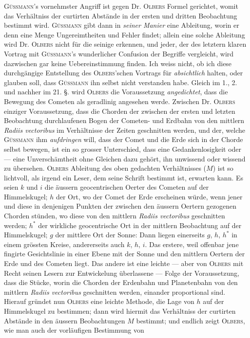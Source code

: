 \textsc{Güssmann}'s vornehmster Angriff ist gegen Dr. \textsc{Olbers} Formel gerichtet, womit das Verhältniss der curtirten Abstände in der ersten und dritten Beobachtung bestimmt wird. \textsc{Güssmann} gibt dann in \emph{seiner Manier} eine Ableitung, worin er denn eine Menge Ungereimtheiten und Fehler findet; allein eine solche Ableitung wird Dr. \textsc{Olbers} nicht für die seinige erkennen, und jeder, der des letztern klaren Vortrag mit \textsc{Güssmann}'s wunderlicher Confusion der Begriffe vergleicht, wird dazwischen gar keine Uebereinstimmung finden. Ich weiss nicht, ob ich diese durchgängige Entstellung des \textsc{Olbers}'schen Vortrags für \emph{absichtlich} halten, oder glauben soll, dass \textsc{Güssmann} ihn selbst nicht verstanden habe. Gleich im 1., 2. und nachher im 21. §. wird \textsc{Olbers} die Voraussetzung \emph{angedichtet}, dass die Bewegung des Cometen als geradlinig angesehen werde. Zwischen Dr. \textsc{Olbers} einziger Voraussetzung, dass die Chorden der zwischen der ersten und letzten Beobachtung durchlaufenen Bogen der Cometen- und Erdbahn von den mittlern \emph{Radiis vectoribus} im Verhältnisse der Zeiten geschnitten werden, und der, welche \textsc{Güssmann} ihm \emph{aufdringen} will, dass der Comet und die Erde sich in der Chorde selbst bewegen, ist ein so grosser Unterschied, dass eine Gedankenlosigkeit oder — eine Unverschämtheit ohne Gleichen dazu gehört, ihn unwissend oder wissend zu übersehen. \textsc{Olbers} Ableitung des oben gedachten Verhältnisses ($M$) ist so lichtvoll, als irgend ein Leser, dem seine Schrift bestimmt ist, erwarten kann. Es seien $k$ und $i$ die äussern geocentrischen Oerter des Cometen auf der Himmelskugel; $h$ der Ort, wo der Comet der Erde erscheinen würde, wenn jener und diese in denjenigen Punkten der zwischen den äussern Oertern gezogenen Chorden stünden, wo diese von den mittlern \emph{Radiis vectoribus} geschnitten werden; $h^*$ der wirkliche geocentrische Ort in der mittlern Beobachtung auf der Himmelskugel; $g$ der mittlere Ort der Sonne: Dann liegen einerseits $g$, $h$, $h^*$ in einem grössten Kreise, andererseits auch $k$, $h$, $i$. Das erstere, weil offenbar jene fingirte Gesichtslinie in einer Ebene mit der Sonne und den mittlern Oertern der Erde und des Cometen liegt. Das andere ist eine leichte — aber von \textsc{Olbers} mit Recht seinen Lesern zur Entwickelung überlassene — Folge der Voraussetzung, dass die Stücke, worin die Chorden der Erdenbahn und Planetenbahn von den mittlern \emph{Radiis vectoribus} geschnitten werden, einander proportional sind. Hierauf gründet nun \textsc{Olbers} eine leichte Methode, die Lage von $h$ auf der Himmelskugel zu bestimmen; dann wird hiermit das Verhältniss der curtirten Abstände in den äussern Beobachtungen $M$ bestimmt; und endlich zeigt \textsc{Olbers}, wie man auch der vorläufigen Bestimmung von
